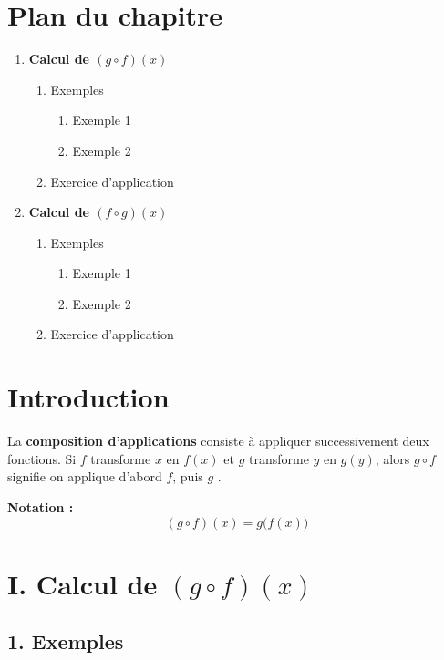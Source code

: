 \documentclass[12pt,a4paper]{article}
\begin{document}
\section*{Plan du chapitre}
\begin{enumerate}
    \item \textbf{Calcul de \( (g \circ f)(x) \)}
    \begin{enumerate}
        \item Exemples
        \begin{enumerate}
            \item Exemple 1
            \item Exemple 2
        \end{enumerate}
        \item Exercice d’application
    \end{enumerate}
    \item \textbf{Calcul de \( (f \circ g)(x) \)}
    \begin{enumerate}
        \item Exemples
        \begin{enumerate}
            \item Exemple 1
            \item Exemple 2
        \end{enumerate}
        \item Exercice d’application
    \end{enumerate}
\end{enumerate}

\newpage

\section*{Introduction}
La \textbf{composition d'applications} consiste à appliquer successivement deux fonctions. 
Si \( f \) transforme \( x \) en \( f(x) \) et \( g \) transforme \( y \) en \( g(y) \), alors \( g \circ f \) signifie \og on applique d'abord \( f \), puis \( g \) \fg{}.

\medskip
\noindent
\textbf{Notation :} 
\[
(g \circ f)(x) = g\big(f(x)\big)
\]

\section*{\color{myred} I. Calcul de \( (g \circ f)(x) \) }

\subsection*{\color{myred} 1. Exemples }
\end{document}
